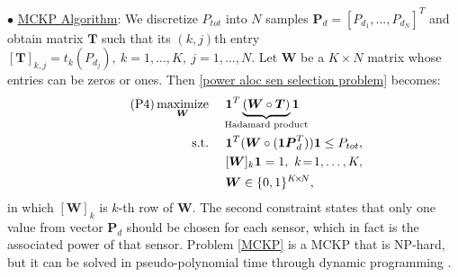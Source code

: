 \documentclass[conference]{IEEEtran}
\begin{document}
%
$\bullet$ \underline{MCKP Algorithm}:
%
%
We discretize $P_{tot}$ into $N$ samples $\boldsymbol{P}_d\!=\![P_{d_1},..., P_{d_N}]^T$ and obtain matrix $\boldsymbol{T}$ such that its $(k,j)$th entry $[\boldsymbol{T}]_{k,j}\!=\!t_k(P_{d_j}),\ k\!=\!1, \dots, K,\ j\!=\!1, \dots, N$. Let $\boldsymbol{W}$ be a $K\!\times\!N$ matrix whose entries can be zeros or ones. Then \eqref{power aloc sen selection problem} becomes:
%
\begin{align} \tag{P4}\label{MCKP}
\mathop{\text{maximize}}_{\boldsymbol{W}}\ \ \ \ &\boldsymbol{1}^T\underbrace{(\boldsymbol{W}\circ\boldsymbol{T})}_{\mathclap{\text{Hadamard product}}}\boldsymbol{1}\nonumber\\
\text{s.t.}\ \ \ \ &\boldsymbol{1}^T(\boldsymbol{W}\circ(\boldsymbol{1}\boldsymbol{P}_d^T))\boldsymbol{1}\leq P_{tot},\nonumber\\
&[\boldsymbol{W}]_k\boldsymbol{1}=1,\ k\!=\!1, \dots, K,\nonumber\\ 
&\boldsymbol{W}\in \{0,1\}^{K\!\times\!N},\nonumber
\end{align}
%
in which $[\boldsymbol{W}]_k$ is $k$-th row of $\boldsymbol{W}$. The second constraint states that only one value from vector $\boldsymbol{P}_d$ should be chosen for each sensor, which in fact is the associated power of that sensor. Problem \eqref{MCKP} is a MCKP that is NP-hard, but it can be solved in pseudo-polynomial time through dynamic programming \cite{PISINGER_MCKP}. 
\end{document}

